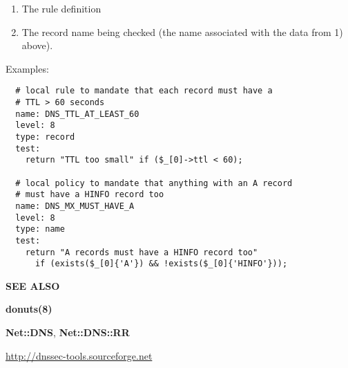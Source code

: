 \begin{description}
\begin{description}
\begin{enumerate}
\item The rule definition

\item The record name being checked (the name associated with
     the data from 1) above).
\end{enumerate}

\end{description}

Examples:

\begin{verbatim}
  # local rule to mandate that each record must have a
  # TTL > 60 seconds
  name: DNS_TTL_AT_LEAST_60
  level: 8
  type: record
  test:
    return "TTL too small" if ($_[0]->ttl < 60);

  # local policy to mandate that anything with an A record
  # must have a HINFO record too
  name: DNS_MX_MUST_HAVE_A
  level: 8
  type: name
  test:
    return "A records must have a HINFO record too"
      if (exists($_[0]{'A'}) && !exists($_[0]{'HINFO'}));
\end{verbatim}

\end{description}

{\bf SEE ALSO}

{\bf donuts(8)}

{\bf Net::DNS}, {\bf Net::DNS::RR}

\url{http://dnssec-tools.sourceforge.net}

